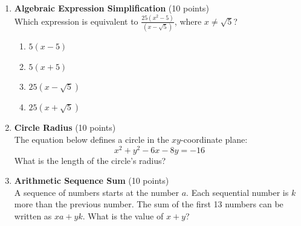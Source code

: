 \begin{enumerate}
  \item \textbf{Algebraic Expression Simplification} (10 points)\\
  Which expression is equivalent to $\frac{25(x^2 - 5)}{(x - \sqrt{5})}$, where $x \neq \sqrt{5}$?
  \begin{enumerate}[label=\Alph*.]
    \item $5(x - 5)$
    \item $5(x + 5)$
    \item $25(x - \sqrt{5})$
    \item $25(x + \sqrt{5})$
  \end{enumerate}
  \begin{subanswer}
  \end{subanswer}

  \item \textbf{Circle Radius} (10 points)\\
  The equation below defines a circle in the $xy$-coordinate plane:
  \[
    x^2 + y^2 - 6x - 8y = -16
  \]
  What is the length of the circle's radius?
  \begin{subanswer}
  \end{subanswer}

  \item \textbf{Arithmetic Sequence Sum} (10 points)\\
  A sequence of numbers starts at the number $a$. Each sequential number is $k$ more than the previous number. The sum of the first 13 numbers can be written as $xa + yk$. What is the value of $x + y$?
  \begin{subanswer}
  \end{subanswer}
\end{enumerate}


